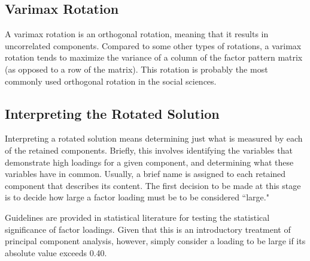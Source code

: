 \documentclass[a4paper,12pt]{article}
\begin{document}

\subsection{Varimax Rotation}
A varimax rotation is an orthogonal rotation, meaning that
it results in uncorrelated components. Compared to some other types of rotations, a varimax
rotation tends to maximize the variance of a column of the factor pattern matrix (as opposed to a
row of the matrix). This rotation is probably the most commonly used orthogonal rotation in the
social sciences.

\subsection{Interpreting the Rotated Solution}

Interpreting a rotated solution means determining just what is measured by each of the retained
components. Briefly, this involves identifying the variables that demonstrate high loadings for a
given component, and determining what these variables have in common. Usually, a brief name
is assigned to each retained component that describes its content.
The first decision to be made at this stage is to decide how large a factor loading must be to be
considered ``large."

Guidelines are provided in statistical literature for testing the statistical significance of factor loadings. Given that this is an introductory treatment of principal component analysis, however, simply consider a loading
to be large if its absolute value exceeds 0.40.
\end{document}
